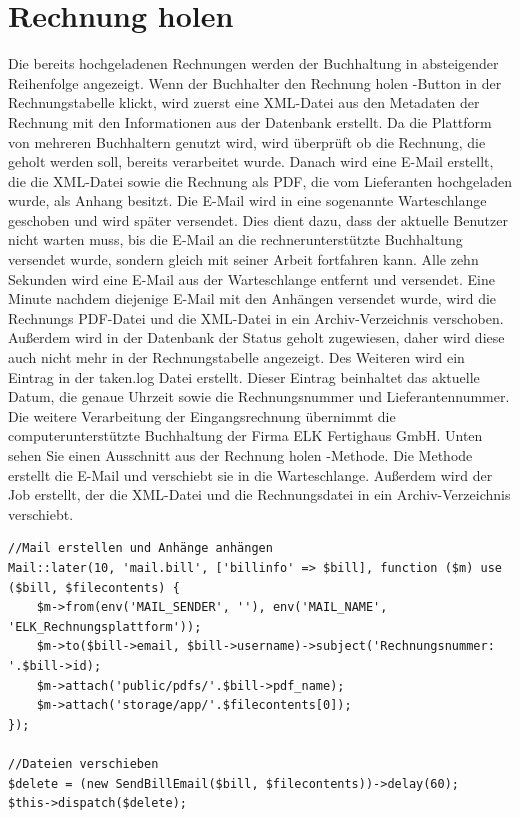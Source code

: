 \section{Rechnung holen}
Die bereits hochgeladenen Rechnungen werden der Buchhaltung in absteigender Reihenfolge angezeigt. Wenn der Buchhalter den \glqq Rechnung holen\grqq{} -Button in der Rechnungstabelle klickt, wird zuerst eine XML-Datei aus den Metadaten der Rechnung mit den Informationen aus der Datenbank erstellt. Da die Plattform von mehreren Buchhaltern genutzt wird, wird überprüft ob die Rechnung, die geholt werden soll, bereits verarbeitet wurde. Danach wird eine E-Mail erstellt, die die XML-Datei sowie die Rechnung als PDF, die vom Lieferanten hochgeladen wurde, als Anhang besitzt. Die E-Mail wird in eine sogenannte Warteschlange geschoben und wird später versendet. Dies dient dazu, dass der aktuelle Benutzer nicht warten muss, bis die E-Mail an die rechnerunterstützte Buchhaltung versendet wurde, sondern gleich mit seiner Arbeit fortfahren kann. Alle zehn Sekunden wird eine E-Mail aus der Warteschlange entfernt und versendet. Eine Minute nachdem diejenige E-Mail mit den Anhängen versendet wurde, wird die Rechnungs PDF-Datei und die XML-Datei in ein Archiv-Verzeichnis verschoben. Außerdem wird in der Datenbank der Status \glqq geholt\grqq{} zugewiesen, daher wird diese auch nicht mehr in der Rechnungstabelle angezeigt. Des Weiteren wird ein Eintrag in der taken.log Datei erstellt. Dieser Eintrag beinhaltet das aktuelle Datum, die genaue Uhrzeit sowie die Rechnungsnummer und Lieferantennummer. Die weitere Verarbeitung der Eingangsrechnung übernimmt die computerunterstützte Buchhaltung der Firma ELK Fertighaus GmbH.
\newpage
Unten sehen Sie einen Ausschnitt aus der \glqq Rechnung holen\grqq{} -Methode. Die Methode erstellt die E-Mail und verschiebt sie in die Warteschlange. Außerdem wird der Job erstellt, der die XML-Datei und die Rechnungsdatei in ein Archiv-Verzeichnis verschiebt.

\begin{lstlisting}
//Mail erstellen und Anhänge anhängen
Mail::later(10, 'mail.bill', ['billinfo' => $bill], function ($m) use ($bill, $filecontents) {
	$m->from(env('MAIL_SENDER', ''), env('MAIL_NAME', 'ELK_Rechnungsplattform'));
	$m->to($bill->email, $bill->username)->subject('Rechnungsnummer: '.$bill->id);
	$m->attach('public/pdfs/'.$bill->pdf_name);
	$m->attach('storage/app/'.$filecontents[0]);
});

//Dateien verschieben
$delete = (new SendBillEmail($bill, $filecontents))->delay(60);
$this->dispatch($delete); 
\end{lstlisting}

